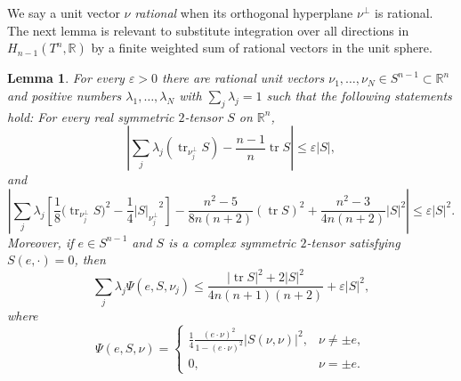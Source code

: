 \documentclass[11pt]{amsart}
\def\R{\mathbb R}
\def\tr{\operatorname{tr}}
\newtheorem{lemm}[thm]{Lemma}
\theoremstyle{remark}
\theoremstyle{definition}
\begin{document}
	
	
	
	
	We say a unit vector $\nu$ {\em rational} when its orthogonal hyperplane $\nu^{\bot}$ is rational. The next lemma is relevant to substitute integration over all directions in $H_{n-1}(T^n,\R)$ by a finite weighted sum of rational vectors in the unit sphere.
	
	\begin{lemm}\label{finite.rational.average}
		For every $\varepsilon>0$ there are rational unit vectors $\nu_1,\ldots,\nu_N\in S^{n-1}\subset \R^n$ and positive numbers $\lambda_1,\ldots,\lambda_N$ with $\sum_j\lambda_j=1$ such that the following statements hold:
		For every real symmetric $2$-tensor $S$ on $\mathbb R^n$,
		$$
		\left|\sum_j\lambda_j(\tr_{\nu_j^{\bot}}S)-\frac{n-1}{n}\tr S\right|\leq\varepsilon|S|,
		$$
		and
		$$
		\left|\!\sum_j\lambda_j\left[\frac18\bigl(\tr_{\nu_j^{\bot}}S\bigr)^2-\!\frac14{\left|S\right|_{\nu_j^{\bot}}}^2\right]-\!\frac{n^2-5}{8n(n+2)}(\tr S)^2+\!\frac{n^2-3}{4n(n+2)}|S|^2\!\right|\leq\varepsilon|S|^2.
		$$
		Moreover, if $e\in S^{n-1}$ and $S$ is a complex symmetric $2$-tensor satisfying $S(e,\cdot)=0$, then
		$$
		\sum_j\lambda_j\Psi(e,S,\nu_j)\leq\frac{|\tr S|^2+2|S|^2}{4n(n+1)(n+2)}+\varepsilon|S|^2,
		$$
		where
		\begin{equation}\label{psi.definition}
			\Psi(e,S,\nu)=
			\begin{cases}
				\displaystyle\frac14\frac{(e\cdot\nu)^2}{1-(e\cdot\nu)^2}|S(\nu,\nu)|^2, & \nu\neq\pm e,\\
				0, & \nu=\pm e.
			\end{cases}
		\end{equation}
	\end{lemm}
\end{document}
